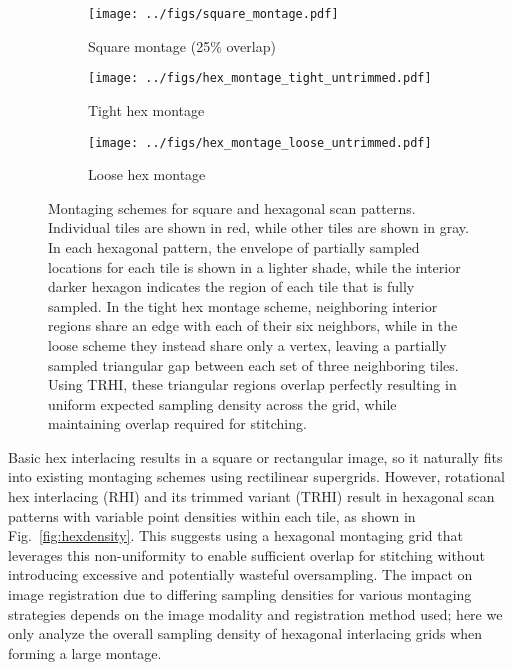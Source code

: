 \documentclass{article}
\newcommand{\reffig}[1]{Fig.~\ref{fig:#1}}
\begin{document}
\begin{figure}[ht]
\centering
    \begin{subfigure}[b]{0.3\textwidth}
        \centering
        \texttt{[image: ../figs/square\_montage.pdf]}
        \caption{Square montage (25\% overlap)}
        \label{fig:square montage}
    \end{subfigure}
    \hfill
    \begin{subfigure}[b]{0.3\textwidth}
        \centering
        \texttt{[image: ../figs/hex\_montage\_tight\_untrimmed.pdf]}
        \caption{Tight hex montage}
        \label{fig:tight hex montage}
    \end{subfigure}
    \hfill
    \begin{subfigure}[b]{0.3\textwidth}
        \centering
        \texttt{[image: ../figs/hex\_montage\_loose\_untrimmed.pdf]}
        \caption{Loose hex montage}
        \label{fig:loose hex montage}
    \end{subfigure}
    \caption{Montaging schemes for square and hexagonal scan patterns.
    Individual tiles are shown in red, while other tiles are shown in gray.
    In each hexagonal pattern, the envelope of partially sampled locations for
    each tile is shown in a lighter shade, while the interior darker hexagon
    indicates the region of each tile that is fully sampled.
    In the tight hex montage scheme, neighboring interior regions share an edge
    with each of their six neighbors, while in the loose scheme they instead
    share only a vertex, leaving a partially sampled triangular gap between each
    set of three neighboring tiles.
    Using TRHI, these triangular regions overlap perfectly resulting in uniform
    expected sampling density across the grid, while maintaining overlap required for
    stitching.}
\label{fig:montage} 
\end{figure}

Basic hex interlacing results in a square or rectangular image, so it naturally
fits into existing montaging schemes using rectilinear supergrids.
%
However, rotational hex interlacing (RHI) and its trimmed variant (TRHI) result in
hexagonal scan patterns with variable point densities within each tile, as shown
in \reffig{hexdensity}.
%
This suggests using a hexagonal montaging grid that leverages this
non-uniformity to enable sufficient overlap for stitching without introducing
excessive and potentially wasteful oversampling.
%
The impact on image registration due to differing sampling densities for various
montaging strategies depends on the image modality and registration method used;
here we only analyze the overall sampling density of hexagonal interlacing grids
when forming a large montage.
\end{document}

